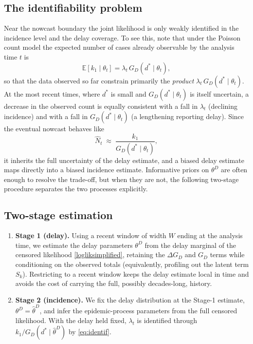 \documentclass{article}
\begin{document}
{\color{red}
\subsection{The identifiability problem}
Near the nowcast boundary the joint likelihood is only weakly identified in the incidence level and the delay coverage. To see this, note that under the Poisson count model the expected number of cases already observable by the analysis time $t$ is
\begin{equation}\label{eq:identif}
  \mathbb{E}[k_1 \mid \theta_t] = \lambda_t\, G_D(d^* \mid \theta_t),
\end{equation}
so that the data observed so far constrain primarily the \emph{product} $\lambda_t\, G_D(d^*\mid\theta_t)$. At the most recent times, where $d^*$ is small and $G_D(d^*\mid\theta_t)$ is itself uncertain, a decrease in the observed count is equally consistent with a fall in $\lambda_t$ (declining incidence) and with a fall in $G_D(d^*\mid\theta_t)$ (a lengthening reporting delay). Since the eventual nowcast behaves like
\begin{equation}
  \widehat{N}_t \;\approx\; \frac{k_1}{G_D(d^*\mid\theta_t)},
\end{equation}
it inherits the full uncertainty of the delay estimate, and a biased delay estimate maps directly into a biased incidence estimate. Informative priors on $\theta^{D}$ are often enough to resolve the trade-off, but when they are not, the following two-stage procedure separates the two processes explicitly.

\subsection{Two-stage estimation}
\begin{enumerate}
  \item \textbf{Stage 1 (delay).} Using a recent window of width $W$ ending at the analysis time, we estimate the delay parameters $\theta^{D}$ from the delay marginal of the censored likelihood \eqref{logliksimplified}, retaining the $\Delta G_D$ and $G_D$ terms while conditioning on the observed totals (equivalently, profiling out the latent term $S_k$). Restricting to a recent window keeps the delay estimate local in time and avoids the cost of carrying the full, possibly decades-long, history.
  \item \textbf{Stage 2 (incidence).} We fix the delay distribution at the Stage-1 estimate, $\theta^{D} = \widehat{\theta}^{D}$, and infer the epidemic-process parameters from the full censored likelihood. With the delay held fixed, $\lambda_t$ is identified through $k_1 / G_D(d^*\mid\widehat\theta^{D})$ by \eqref{eq:identif}.
\end{enumerate}

}
\end{document}
